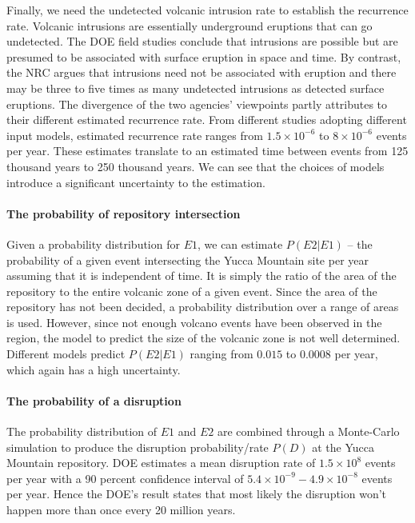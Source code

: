 \documentclass[nofootinbib,preprint,aps]{revtex4-1}
\begin{document}
        Finally, we need the undetected volcanic intrusion rate to establish the recurrence rate. Volcanic
        intrusions are essentially underground eruptions that can go undetected. The DOE field studies conclude
        that intrusions are possible but are presumed to be associated with surface eruption in space and time. 
        By contrast, the NRC argues that intrusions need not be associated with eruption and there
        may be three to five times as many undetected intrusions as detected surface eruptions. The divergence
        of the two agencies' viewpoints partly attributes to their different estimated recurrence rate.
        From different studies adopting different input models, estimated recurrence rate ranges from
        $1.5\times 10^{-6}$ to $8\times 10^{-6}$ events per year. These estimates translate to an estimated
        time between events from 125 thousand years to 250 thousand years. We can see that the choices of
        models introduce a significant uncertainty to the estimation.\cite{cv14}

        \paragraph{The probability of repository intersection}
        Given a probability distribution for $E1$, we can estimate $P(E2|E1)$ -- the probability of
        a given event intersecting the Yucca Mountain site per year assuming that it is independent
        of time. It is simply the ratio of the area of
        the repository to the entire volcanic zone of a given event. Since the area of the repository
        has not been decided, a probability distribution over a range of areas is used.
        However, since not enough volcano events have been observed in the region, the model
        to predict the size of the volcanic zone is not well determined.
        Different models predict $P(E2|E1)$ ranging from $0.015$ to $0.0008$ per year, which again has a high
        uncertainty.

        \paragraph{The probability of a disruption} The probability distribution of $E1$ and $E2$
        are combined through a Monte-Carlo simulation to produce the disruption probability/rate $P(D)$
        at the Yucca Mountain repository. DOE estimates a mean disruption rate of $1.5\times 10^8$ events
        per year with
        a 90 percent confidence interval of $5.4\times 10^{-9}-4.9\times 10^{-8}$ events per year. Hence the DOE's result
        states that most likely the disruption won't happen more than once every 20 million years.
\end{document}
